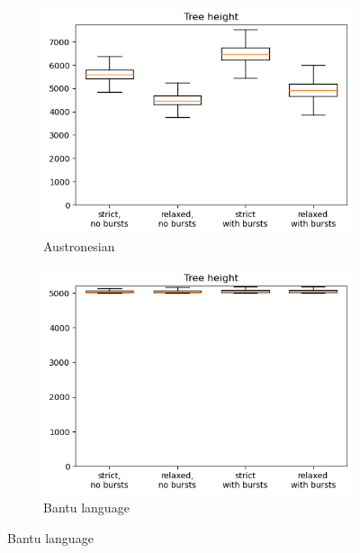 \documentclass[a4paper]{article}
\begin{document}
\begin{figure}[h]
  \centering
  \begin{subfigure}{0.4\textwidth}
    \includegraphics[width=\textwidth]{supplement/analysis/austronesian_treeheight.png}
    \caption{Austronesian}
    \label{fig:tree_height:austronesian}
  \end{subfigure}
  \begin{subfigure}{0.4\textwidth}
    \includegraphics[width=\textwidth]{supplement/analysis/bantu_treeheight.png}
    \caption{Bantu language}
    \label{fig:tree_height:bantu}
  \end{subfigure}


\end{figure}
\end{document}
